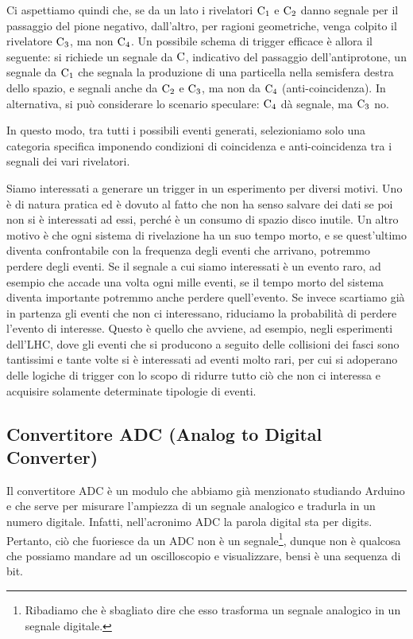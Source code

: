 \begin{esempio}
   Ci aspettiamo quindi che, se da un lato i rivelatori $\rm C_1$ e $\rm C_2$ danno segnale per il passaggio del pione negativo, dall'altro, per ragioni geometriche, venga colpito il rivelatore $\rm C_3$, ma non $\rm C_4$. Un possibile schema di trigger efficace è allora il seguente: si richiede un segnale da $\rm C$, indicativo del passaggio dell'antiprotone, un segnale da $\rm C_1$ che segnala la produzione di una particella nella semisfera destra dello spazio, e segnali anche da $\rm C_2$ e $\rm C_3$, ma non da $\rm C_4$ (anti-coincidenza). In alternativa, si può considerare lo scenario speculare: $\rm C_4$ dà segnale, ma $\rm C_3$ no.

   In questo modo, tra tutti i possibili eventi generati, selezioniamo solo una categoria specifica imponendo condizioni di coincidenza e anti-coincidenza tra i segnali dei vari rivelatori.
\end{esempio}

Siamo interessati a generare un trigger in un esperimento per diversi motivi. Uno è di natura pratica ed è dovuto al fatto che non ha senso salvare dei dati se poi non si è interessati ad essi, perché è un consumo di spazio disco inutile. Un altro motivo è che ogni sistema di rivelazione ha un suo tempo morto, e se quest'ultimo diventa confrontabile con la frequenza degli eventi che arrivano, potremmo perdere degli eventi. Se il segnale a cui siamo interessati è un evento raro, ad esempio che accade una volta ogni mille eventi, se il tempo morto del sistema diventa importante potremmo anche perdere quell'evento. Se invece scartiamo già in partenza gli eventi che non ci interessano, riduciamo la probabilità di perdere l'evento di interesse. Questo è quello che avviene, ad esempio, negli esperimenti dell'LHC, dove gli eventi che si producono a seguito delle collisioni dei fasci sono tantissimi e tante volte si è interessati ad eventi molto rari, per cui si adoperano delle logiche di trigger con lo scopo di ridurre tutto ciò che non ci interessa e acquisire solamente determinate tipologie di eventi.

\subsection{Convertitore ADC (Analog to Digital Converter)}

Il convertitore ADC è un modulo che abbiamo già menzionato studiando Arduino e che serve per misurare l'ampiezza di un segnale analogico e tradurla in un numero digitale. Infatti, nell'acronimo ADC la parola digital sta per digits. Pertanto, ciò che fuoriesce da un ADC non è un segnale\footnote{Ribadiamo che è sbagliato dire che esso trasforma un segnale analogico in un segnale digitale.}, dunque non è qualcosa che possiamo mandare ad un oscilloscopio e visualizzare, bensi è una sequenza di bit.

